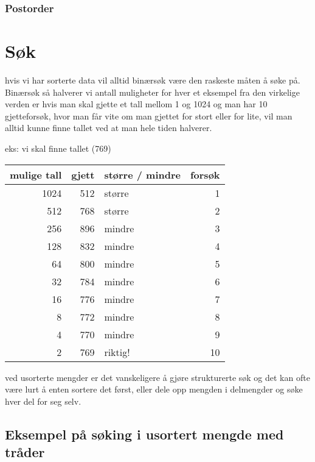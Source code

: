 \documentclass[11pt]{article}
\begin{document}
\subsubsection{Postorder}
\label{sec-10_2_3}
\section{Søk}
\label{sec-11}

  hvis vi har sorterte data vil alltid binærsøk være den raskeste måten
  å søke på. Binærsøk så halverer vi antall muligheter for hver et eksempel
  fra den virkelige verden er hvis man skal gjette et tall mellom 1 og 1024
  og man har 10 gjetteforsøk, hvor man får vite om man gjettet for stort eller
  for lite, vil man alltid kunne finne tallet ved at man hele tiden halverer.

  eks: vi skal finne tallet (769)

\begin{center}
\begin{tabular}{rrlr}
\hline
 mulige tall  &  gjett  &  større / mindre  &  forsøk  \\
\hline
        1024  &    512  &  større           &       1  \\
\hline
         512  &    768  &  større           &       2  \\
\hline
         256  &    896  &  mindre           &       3  \\
\hline
         128  &    832  &  mindre           &       4  \\
\hline
          64  &    800  &  mindre           &       5  \\
\hline
          32  &    784  &  mindre           &       6  \\
\hline
          16  &    776  &  mindre           &       7  \\
\hline
           8  &    772  &  mindre           &       8  \\
\hline
           4  &    770  &  mindre           &       9  \\
\hline
           2  &    769  &  riktig!          &      10  \\
\hline
\end{tabular}
\end{center}



  ved usorterte mengder er det vanskeligere å gjøre strukturerte søk og det kan ofte
  være lurt å enten sortere det først, eller dele opp mengden i delmengder og søke hver
  del for seg selv.
\subsection{Eksempel på søking i usortert mengde med tråder}
\label{sec-11_1}
\end{document}
